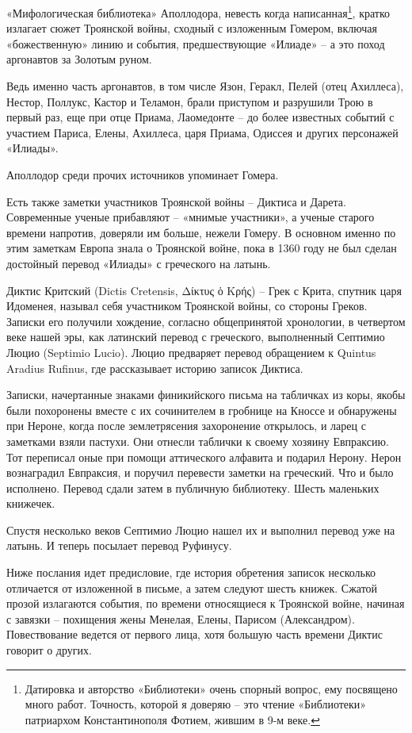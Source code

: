 «Мифологическая библиотека» Аполлодора, невесть когда написанная\footnote{Датировка и авторство «Библиотеки» очень спорный вопрос, ему посвящено много работ. Точность, которой я доверяю – это чтение «Библиотеки» патриархом Константинополя Фотием, жившим в 9-м веке.}, кратко излагает сюжет Троянской войны, сходный с изложенным Гомером, включая «божественную» линию и события, предшествующие «Илиаде» – а это поход аргонавтов за Золотым руном.

Ведь именно часть аргонавтов, в том числе Язон, Геракл, Пелей (отец Ахиллеса), Нестор, Поллукс, Кастор и Теламон, брали приступом и разрушили Трою в первый раз, еще при отце Приама, Лаомедонте – до более известных событий с участием Париса, Елены, Ахиллеса, царя Приама, Одиссея и других персонажей «Илиады».

Аполлодор среди прочих источников упоминает Гомера.

Есть также заметки участников Троянской войны – Диктиса и Дарета. Современные ученые прибавляют – «мнимые участники», а ученые старого времени напротив, доверяли им больше, нежели Гомеру. В основном именно по этим заметкам Европа знала о Троянской войне, пока в 1360 году не был сделан достойный перевод «Илиады» с греческого на латынь.

Диктис Критский (Dictis Cretensis, Δίκτυς ὁ Κρής) – Грек с Крита, спутник царя Идоменея, называл себя участником Троянской войны, со стороны Греков. Записки его получили хождение, согласно общепринятой хронологии, в четвертом веке нашей эры, как латинский перевод с греческого, выполненный Септимио Люцио (Septimio Lucio). Люцио предваряет перевод обращением к Quintus Aradius Rufinus, где рассказывает историю записок Диктиса.

Записки, начертанные знаками финикийского письма на табличках из коры, якобы были похоронены вместе с их сочинителем в гробнице на Кноссе и обнаружены при Нероне, когда после землетрясения захоронение открылось, и ларец с заметками взяли пастухи. Они отнесли таблички к своему хозяину Евпраксию. Тот переписал оные при помощи аттического алфавита и подарил Нерону. Нерон вознаградил Евпраксия, и поручил перевести заметки на греческий. Что и было исполнено. Перевод сдали затем в публичную библиотеку. Шесть маленьких книжечек.

Спустя несколько веков Септимио Люцио нашел их и выполнил перевод уже на латынь. И теперь посылает перевод Руфинусу.

Ниже послания идет предисловие, где история обретения записок несколько отличается от изложенной в письме, а затем следуют шесть книжек. Сжатой прозой излагаются события, по времени относящиеся к Троянской войне, начиная с завязки – похищения жены Менелая, Елены, Парисом (Александром). Повествование ведется от первого лица, хотя большую часть времени Диктис говорит о других. 

